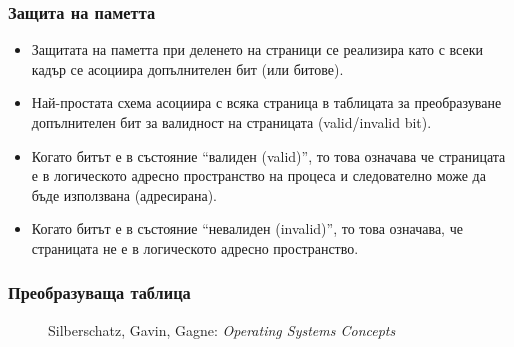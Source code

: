 \documentclass[ignorenonframetext, hyperref=unicode]{beamer}
\begin{document}
\begin{frame}
\frametitle{Защита на паметта}
\begin{itemize}
  \item Защитата на паметта при деленето на страници се реализира като с всеки
  кадър се асоциира допълнителен бит (или битове).
  \item Най-простата схема асоциира с всяка страница в таблицата за
  преобразуване допълнителен бит за валидност на страницата (valid/invalid bit).
  \item Когато битът е в състояние ``валиден (valid)'', то това означава че
  страницата е в логическото адресно пространство на процеса и следователно
  може да бъде използвана (адресирана).
  \item Когато битът е в състояние ``невалиден (invalid)'', то това означава,
  че страницата не е в логическото адресно пространство.
\end{itemize}
\end{frame}

\begin{frame}
\frametitle{Преобразуваща таблица}
\begin{figure}[h]
\center
{}
\caption{Silberschatz, Gavin, Gagne: {\em Operating Systems Concepts}}
\end{figure}
\end{frame}
\end{document}
